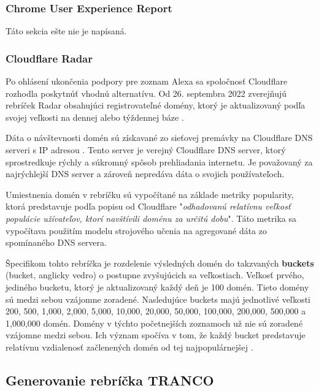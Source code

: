 \subsubsection{Chrome User Experience Report}

Táto sekcia ešte nie je napísaná.

\subsubsection{Cloudflare Radar}

Po ohlásení ukončenia podpory pre zoznam Alexa sa spoločnosť Cloudflare rozhodla poskytnúť vhodnú alternatívu.
Od 26. septembra 2022 zverejňujú rebríček Radar obsahujúci registrovateľné domény, ktorý je aktualizovaný podľa svojej veľkosti na dennej alebo týždennej báze \cite{tranco-methodology}.

Dáta o návštevnosti domén sú získavané zo sieťovej premávky na Cloudflare DNS serveri s IP adresou .
Tento server je verejný Cloudflare DNS server, ktorý sprostredkuje rýchly a súkromný spôsob prehliadania internetu.
Je považovaný za najrýchlejší DNS server a zároveň nepredáva dáta o svojich používateľoch. %

Umiestnenia domén v rebríčku sú vypočítané na základe metriky popularity, ktorá predstavuje podľa popisu od Cloudflare "\textit{odhadovanú relatívnu veľkosť populácie užívateľov, ktorí navštívili doménu za určitú dobu}".
Táto metrika sa vypočítava použitím modelu strojového učenia na agregované dáta zo spomínaného DNS servera. 

Špecifikom tohto rebríčka je rozdelenie výsledných domén do takzvaných \textbf{buckets} (bucket, anglicky vedro) o postupne zvyšujúcich sa veľkostiach.
Veľkosť prvého, jediného bucketu, ktorý je aktualizovaný každý deň je 100 domén. Tieto domény sú medzi sebou vzájomne zoradené.
Nasledujúce buckets majú jednotlivé veľkosti 200, 500, 1,000, 2,000, 5,000, 10,000, 20,000, 50,000, 100,000, 200,000, 500,000 a 1,000,000 domén.
Domény v týchto početnejších zoznamoch už nie sú zoradené vzájomne medzi sebou.
Ich význam spočíva v tom, že každý bucket predstavuje relatívnu vzdialenosť začlenených domén od tej najpopulárnejšej \cite{cloudflare-radar}.



\subsection{Generovanie rebríčka TRANCO}
\label{tranco-generation}

